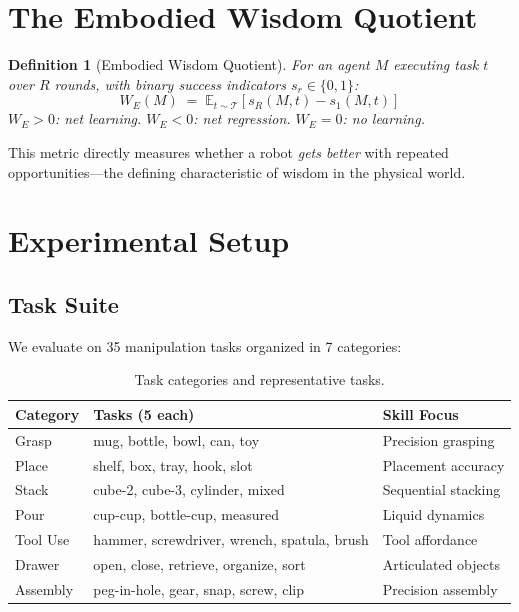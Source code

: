\documentclass{article}
\newtheorem{definition}{Definition}
\newcommand{\cT}{\mathcal{T}}
\newcommand{\E}{\mathbb{E}}
\begin{document}
\section{The Embodied Wisdom Quotient}
\label{sec:ewq}

\begin{definition}[Embodied Wisdom Quotient]
For an agent $M$ executing task $t$ over $R$ rounds, with binary success indicators $s_r \in \{0, 1\}$:
\begin{equation}
    W_E(M) \;=\; \E_{t \sim \cT}\left[s_R(M, t) - s_1(M, t)\right]
\end{equation}
$W_E > 0$: net learning. $W_E < 0$: net regression. $W_E = 0$: no learning.
\end{definition}

This metric directly measures whether a robot \emph{gets better} with repeated opportunities---the defining characteristic of wisdom in the physical world.

\section{Experimental Setup}
\label{sec:experiments}

\subsection{Task Suite}

We evaluate on 35 manipulation tasks organized in 7 categories:

\begin{table}[h]
\centering
\caption{Task categories and representative tasks.}
\label{tab:tasks}
\begin{tabular}{lll}
\toprule
\textbf{Category} & \textbf{Tasks (5 each)} & \textbf{Skill Focus} \\
\midrule
Grasp & mug, bottle, bowl, can, toy & Precision grasping \\
Place & shelf, box, tray, hook, slot & Placement accuracy \\
Stack & cube-2, cube-3, cylinder, mixed & Sequential stacking \\
Pour & cup-cup, bottle-cup, measured & Liquid dynamics \\
Tool Use & hammer, screwdriver, wrench, spatula, brush & Tool affordance \\
Drawer & open, close, retrieve, organize, sort & Articulated objects \\
Assembly & peg-in-hole, gear, snap, screw, clip & Precision assembly \\
\bottomrule
\end{tabular}
\end{table}
\end{document}
